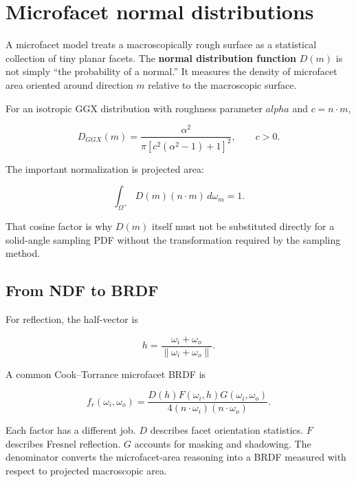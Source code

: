\hypertarget{appendix-885c1cb64ae9}{}\label{referencestart:appendix-885c1cb64ae9}
\section{Microfacet normal distributions}\label{appendix-885c1cb64ae9-microfacet-normal-distributions}

\hypertarget{appendix-885c1cb64ae9-microfacet-normal-distributions}{}

A microfacet model treats a macroscopically rough surface as a statistical collection of tiny planar facets. The \textbf{normal distribution function} \(D(m)\) is not simply ``the probability of a normal.'' It measures the density of microfacet area oriented around direction \(m\) relative to the macroscopic surface.

For an isotropic GGX distribution with roughness parameter \(alpha\) and \(c = n\cdot m\),

\[
D_{GGX}(m)=
\frac{\alpha^2}
{\pi\left[c^2(\alpha^2-1)+1\right]^2},
\qquad c>0.
\]

The important normalization is projected area:

\[
\int_{\Omega^+} D(m)(n\cdot m)\,d\omega_m = 1.
\]

That cosine factor is why \(D(m)\) itself must not be substituted directly for a solid-angle sampling PDF without the transformation required by the sampling method.

\subsection{From NDF to BRDF}\label{appendix-885c1cb64ae9-from-ndf-to-brdf}

\hypertarget{appendix-885c1cb64ae9-from-ndf-to-brdf}{}

For reflection, the half-vector is

\[
h=\frac{\omega_i+\omega_o}{\|\omega_i+\omega_o\|}.
\]

A common Cook--Torrance microfacet BRDF is

\[
f_r(\omega_i,\omega_o)=
\frac{D(h)F(\omega_i,h)G(\omega_i,\omega_o)}
{4(n\cdot\omega_i)(n\cdot\omega_o)}.
\]

Each factor has a different job. \(D\) describes facet orientation statistics. \(F\) describes Fresnel reflection. \(G\) accounts for masking and shadowing. The denominator converts the microfacet-area reasoning into a BRDF measured with respect to projected macroscopic area.

